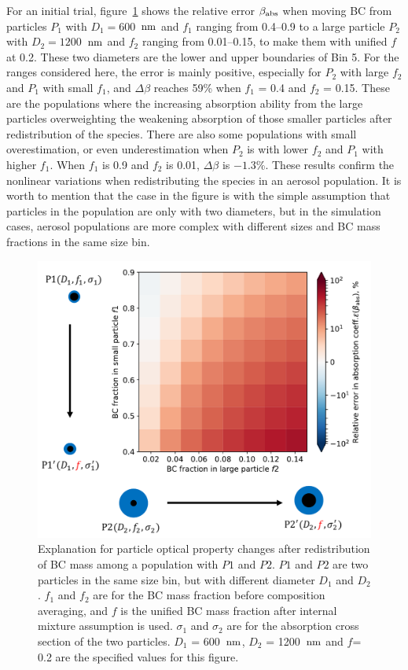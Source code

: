 \documentclass[edeposit,fullpage]{uiucthesis2009}
\makeatletter
\DeclareRobustCommand*\unit[1]
 {\ensuremath{%
   {\thinmuskip3mu\relax
    \def\mu{\text{\textmu}}\def~{\,}%
    \ifx\f@series\testbx\mathbf{#1}\else\mathrm{#1}\fi}}}
\makeatother
\begin{document}
  For an initial trial, figure~\ref{fig_sup2} shows the relative
  error $\beta_{\rm abs}$ when moving BC from particles $P_1$ with
  $D_1 = 600$~\unit{nm} and $f_1$ ranging from 0.4--0.9 to a large
  particle $P_2$ with $D_2 = 1200$~\unit{nm} and $f_2$ ranging from
  0.01--0.15, to make them with unified $f$ at 0.2.  These two
  diameters are the lower and upper boundaries of Bin 5. For the
  ranges considered here, the error is mainly positive, especially for
  $P_2$ with large $f_2$ and $P_1$ with small $f_1$, and $\Delta
  \beta$ reaches 59\% when $f_1$ = 0.4 and $f_2$ = 0.15. These are the
  populations where the increasing absorption ability from the large
  particles overweighting the weakening absorption of those smaller
  particles after redistribution of the species. There are also some
  populations with small overestimation, or even underestimation when
  $P_2$ is with lower $f_2$ and $P_1$ with higher $f_1$. When $f_1$ is
  0.9 and $f_2$ is 0.01, $\Delta \beta$ is $-1.3$\%. These results
  confirm the nonlinear variations when redistributing the species in
  an aerosol population. It is worth to mention that the case in the
  figure is with the simple assumption that particles in the
  population are only with two diameters, but in the simulation cases,
  aerosol populations are more complex with different sizes and BC
  mass fractions in the same size bin.
  
\begin{figure}
	\centering
	\includegraphics[scale=0.6]{chap4_figs/fig_sup2.pdf}
	\caption{Explanation for particle optical property changes
          after redistribution of BC mass among a
          population with $P1$ and $P2$. $P1$ and $P2$ are two
          particles in the same size bin, but with different diameter
          $D_1$ and $D_2$. $f_1$ and $f_2$ are for the BC mass
          fraction before composition averaging, and $f$ is the
          unified BC mass fraction after internal mixture assumption
          is used. $\sigma_1$ and $\sigma_2$ are for the absorption
          cross section of the two particles.  $D_1$ = 600~\unit{nm}, $D_2$ =
          1200~\unit{nm} and $f$= 0.2 are the specified values for this
          figure. }
	\label{fig_sup2}
\end{figure}
  
\end{document}
